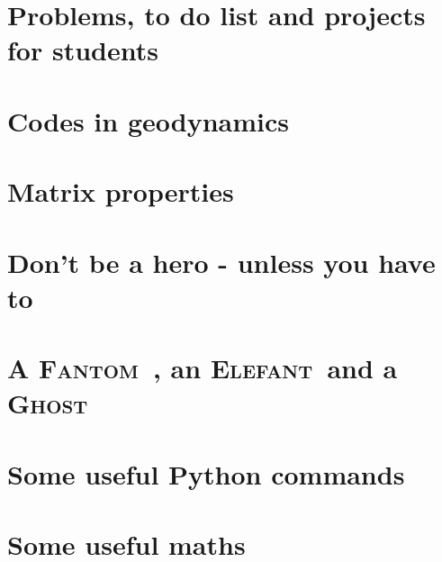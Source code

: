 \documentclass[a4paper]{article}
\newcommand{\elefant}{{\textsc{Elefant~}{}}}
\newcommand{\fantom}{{\textsc{Fantom~}{}}}
\newcommand{\ghost}{{\textsc{Ghost~}{}}}
\numberwithin{equation}{section}
\begin{document}
\newpage %
\section{Problems, to do list and projects for students} %

\appendix %

\newpage %
\section{Codes in geodynamics \label{app:codes} } %
\newpage %
\section{Matrix properties}  %
\newpage %
\section{Don't be a hero - unless you have to}  %
\newpage %
\section{A \fantom, an \elefant and a \ghost}  %
\newpage %
\section{Some useful Python commands}  %
\newpage %
\section{Some useful maths}  \label{app_maths} %
\newpage %
\end{document}
